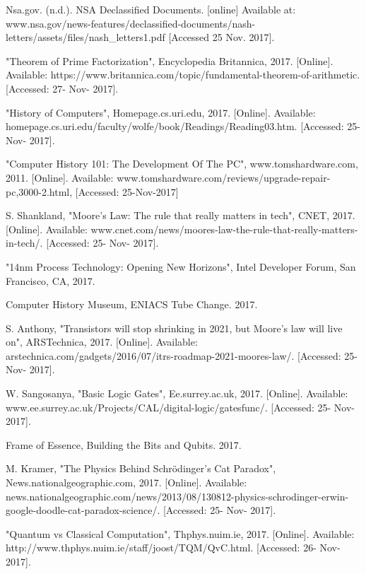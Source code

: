 \documentclass[10pt,journal,compsoc]{IEEEtran}
\begin{document}
\begin{thebibliography}{1}
	Nsa.gov. (n.d.). NSA Declassified Documents. [online] Available at: www.nsa.gov/news-features/declassified-documents/nash-letters/assets/files/nash\_letters1.pdf [Accessed 25 Nov. 2017].

	"Theorem of Prime Factorization", Encyclopedia Britannica, 2017. [Online]. Available: https://www.britannica.com/topic/fundamental-theorem-of-arithmetic. [Accessed: 27- Nov- 2017].
	
	"History of Computers", Homepage.cs.uri.edu, 2017. [Online]. Available: homepage.cs.uri.edu/faculty/wolfe/book/Readings/Reading03.htm. [Accessed: 25- Nov- 2017].
	
	"Computer History 101: The Development Of The PC", www.tomshardware.com, 2011. [Online]. Available: www.tomshardware.com/reviews/upgrade-repair-pc,3000-2.html, [Accessed: 25-Nov-2017]	
	
	S. Shankland, "Moore's Law: The rule that really matters in tech", CNET, 2017. [Online]. Available: www.cnet.com/news/moores-law-the-rule-that-really-matters-in-tech/. [Accessed: 25- Nov- 2017].	
	

	
	"14nm Process Technology: Opening New Horizons", Intel Developer Forum, San Francisco, CA, 2017.
	
	Computer History Museum, ENIACS Tube Change. 2017.


	S. Anthony, "Transistors will stop shrinking in 2021, but Moore’s law will live on", ARSTechnica, 2017. [Online]. Available: arstechnica.com/gadgets/2016/07/itrs-roadmap-2021-moores-law/. [Accessed: 25- Nov- 2017].

	W. Sangosanya, "Basic Logic Gates", Ee.surrey.ac.uk, 2017. [Online]. Available: www.ee.surrey.ac.uk/Projects/CAL/digital-logic/gatesfunc/. [Accessed: 25- Nov- 2017].
	
	Frame of Essence, Building the Bits and Qubits. 2017.


	M. Kramer, "The Physics Behind Schrödinger's Cat Paradox", News.nationalgeographic.com, 2017. [Online]. Available: news.nationalgeographic.com/news/2013/08/130812-physics-schrodinger-erwin-google-doodle-cat-paradox-science/. [Accessed: 25- Nov- 2017].	

	"Quantum vs Classical Computation", Thphys.nuim.ie, 2017. [Online]. Available: http://www.thphys.nuim.ie/staff/joost/TQM/QvC.html. [Accessed: 26- Nov- 2017].
	

\end{thebibliography}
\end{document}

